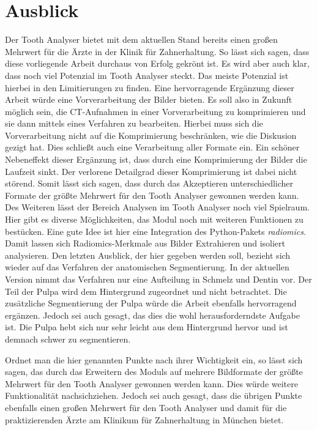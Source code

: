 \chapter{Ausblick}
\label{chap:schlussfolgerung} Der Tooth Analyser bietet mit dem aktuellen Stand bereits
einen großen Mehrwert für die Ärzte in der Klinik für Zahnerhaltung. So lässt
sich sagen, dass diese vorliegende Arbeit durchaus von Erfolg gekrönt ist. Es
wird aber auch klar, dass noch viel Potenzial im Tooth Analyser steckt. Das
meiste Potenzial ist hierbei in den Limitierungen zu finden. Eine hervorragende Ergänzung
dieser Arbeit würde eine Vorverarbeitung der Bilder bieten. Es soll also in
Zukunft möglich sein, die \ac{CT}-Aufnahmen in einer Vorverarbeitung zu
komprimieren und sie dann mittels eines Verfahren zu bearbeiten. Hierbei muss sich
die Vorverarbeitung nicht auf die Komprimierung beschränken, wie die Diskusion
gezigt hat. Dies schließt auch eine Verarbeitung aller Formate ein. Ein schöner
Nebeneffekt dieser Ergänzung ist, dass durch eine Komprimierung der Bilder die Laufzeit
sinkt. Der verlorene Detailgrad dieser Komprimierung ist dabei nicht störend. Somit
lässt sich sagen, dass durch das Akzeptieren unterschiedlicher Formate der
größte Mehrwert für den Tooth Analyser gewonnen werden kann. Des Weiteren lässt der
Bereich Analysen im Tooth Analyser noch viel Spielraum. Hier gibt es diverse
Möglichkeiten, das Modul noch mit weiteren Funktionen zu bestücken. Eine gute
Idee ist hier eine Integration des Python-Pakets \textit{radiomics}. Damit
lassen sich Radiomics-Merkmale aus Bilder Extrahieren und isoliert analysieren. Den
letzten Ausblick, der hier gegeben werden soll, bezieht sich wieder auf das Verfahren
der anatomischen Segmentierung. In der aktuellen Version nimmt das Verfahren nur
eine Aufteilung in Schmelz und Dentin vor. Der Teil der Pulpa wird dem Hintergrund
zugeordnet und nicht betrachtet. Die zusätzliche Segmentierung der Pulpa würde
die Arbeit ebenfalls hervorragend ergänzen. Jedoch sei auch gesagt, das dies die
wohl herausforderndste Aufgabe ist. Die Pulpa hebt sich nur sehr leicht aus dem Hintergrund
hervor und ist demnach schwer zu segmentieren.

Ordnet man die hier genannten Punkte nach ihrer Wichtigkeit ein, so lässt sich
sagen, das durch das Erweitern des Moduls auf mehrere Bildformate der größte Mehrwert
für den Tooth Analyser gewonnen werden kann. Dies würde weitere Funktionalität
nachsichziehen. Jedoch sei auch gesagt, dass die übrigen Punkte ebenfalls einen
großen Mehrwert für den Tooth Analyser und damit für die praktizierenden Ärzte
am Klinikum für Zahnerhaltung in München bietet.
